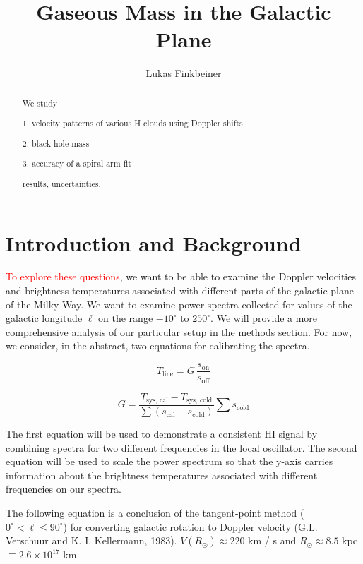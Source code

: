 \documentclass[12pt]{article}
\title{Gaseous Mass in the Galactic Plane}
\author{Lukas Finkbeiner}
\begin{document}
\maketitle

\begin{abstract}


We study

1. velocity patterns of various H clouds using Doppler shifts

2. black hole mass

3. accuracy of a spiral arm fit

results, uncertainties.

\end{abstract}

\section{Introduction and Background}

\textcolor{red}{To explore these questions}, we want to be able to examine the Doppler velocities and brightness temperatures associated with different parts of the galactic plane of the Milky Way. We want to examine power spectra collected for values of the galactic longitude $\ell$ on the range $-10^\circ$ to $250^\circ$. We will provide a more comprehensive analysis of our particular setup in the methods section. For now, we consider, in the abstract, two equations for calibrating the spectra. 

\begin{equation} \label{eq:line_shape}
T_\text{line} = G \, \frac{s_\text{on}}{s_\text{off}}
\end{equation}

\begin{equation} \label{eq:line_gain}
G = \frac{T_\text{sys, cal} - T_\text{sys, cold}}{\sum{(s_\text{cal} - s_\text{cold})}} \sum{s_\text{cold}}
\end{equation}

The first equation will be used to demonstrate a consistent HI signal by combining spectra for two different frequencies in the local oscillator. The second equation will be used to scale the power spectrum so that the y-axis carries information about the brightness temperatures associated with different frequencies on our spectra.

The following equation is a conclusion of the tangent-point method ($0^\circ < \ell \leq 90^\circ$) for converting galactic rotation to Doppler velocity (G.L. Verschuur and K. I. Kellermann, 1983). $V(R_\odot) \approx 220 $ km / s and $R_\odot \approx 8.5$ kpc $\equiv 2.6 \times 10^{17}$ km. 
\end{document}

